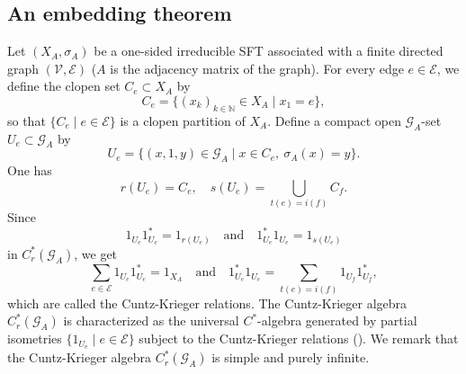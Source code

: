 \documentclass[11pt]{article}
\theoremstyle{definition}
\numberwithin{equation}{section}
\newcommand{\G}{\mathcal{G}}
\newcommand{\N}{\mathbb{N}}
\begin{document}
\subsection{An embedding theorem}


Let $(X_A,\sigma_A)$ be a one-sided irreducible SFT 
associated with a finite directed graph $(\mathcal{V},\mathcal{E})$ 
($A$ is the adjacency matrix of the graph). 
For every edge $e\in\mathcal{E}$, 
we define the clopen set $C_e\subset X_A$ by 
\[
C_e=\{(x_k)_{k\in\N}\in X_A\mid x_1=e\}, 
\]
so that $\{C_e\mid e\in\mathcal{E}\}$ is a clopen partition of $X_A$. 
Define a compact open $\G_A$-set $U_e\subset\G_A$ by 
\[
U_e=\{(x,1,y)\in\G_A\mid x\in C_e,\ \sigma_A(x)=y\}. 
\]
One has 
\[
r(U_e)=C_e,\quad s(U_e)=\bigcup_{t(e)=i(f)}C_f. 
\]
Since 
\[
1_{U_e}1_{U_e}^*=1_{r(U_e)}\quad\text{and}\quad 
1_{U_e}^*1_{U_e}=1_{s(U_e)}
\]
in $C^*_r(\G_A)$, we get 
\[
\sum_{e\in\mathcal{E}}1_{U_e}1_{U_e}^*=1_{X_A}\quad\text{and}\quad 
1_{U_e}^*1_{U_e}=\sum_{t(e)=i(f)}1_{U_f}1_{U_f}^*, 
\]
which are called the Cuntz-Krieger relations. 
The Cuntz-Krieger algebra $C^*_r(\G_A)$ is characterized 
as the universal $C^*$-algebra 
generated by partial isometries $\{1_{U_e}\mid e\in\mathcal{E}\}$ 
subject to the Cuntz-Krieger relations (\cite{CK80Invent}). 
We remark that 
the Cuntz-Krieger algebra $C^*_r(\G_A)$ is simple and purely infinite. 
\end{document}
